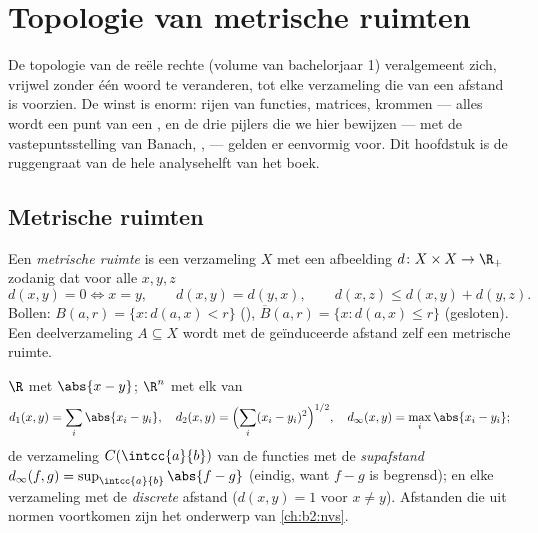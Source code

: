\chapter{Topologie van metrische ruimten}\label{ch:b2:metric}

De topologie van de reële rechte (volume van bachelorjaar 1)
veralgemeent zich, vrijwel zonder één woord te veranderen, tot elke
verzameling die van een afstand is voorzien. De winst is enorm:
rijen van functies, matrices, krommen --- alles wordt een punt van
een , en de drie pijlers die we hier bewijzen ---
 met de vastepuntsstelling van Banach, ,
 --- gelden er eenvormig voor. Dit hoofdstuk is de
ruggengraat van de hele analysehelft van het boek.

\section{Metrische ruimten}

\begin{definition}\label{def:b2:metric:def}
Een \emph{metrische ruimte} is een
verzameling $X$ met een afbeelding $d \colon X \times X \to \R_+$
zodanig dat voor alle $x, y, z$
\[
d(x,y) = 0 \iff x = y,
\qquad
d(x,y) = d(y,x),
\qquad
d(x,z) \leq d(x,y) + d(y,z).
\]
Bollen: $B(a, r) = \{x : d(a,x) < r\}$ (), $\overline B(a,r) =
\{x : d(a,x) \leq r\}$ (gesloten). Een deelverzameling $A \subseteq
X$ wordt met de geïnduceerde afstand zelf een metrische ruimte.
\end{definition}

\begin{example}\label{ex:b2:metric:examples}
$\R$ met $\abs{x - y}$; $\R^n$ met elk van
\[
d_1(x,y) = \sum_i \abs{x_i - y_i},
\quad
d_2(x,y) = \Bigl(\sum_i (x_i - y_i)^2\Bigr)^{1/2},
\quad
d_\infty(x,y) = \max_i \abs{x_i - y_i};
\]
de verzameling $C(\intcc{a}{b})$ van de  functies met de
\emph{supafstand} $d_\infty(f, g) = \sup_{\intcc{a}{b}} \abs{f -
g}$ (eindig, want $f - g$ is begrensd); en elke verzameling met de
\emph{discrete} afstand ($d(x,y) = 1$ voor $x \neq y$). Afstanden
die uit normen voortkomen zijn het onderwerp van
\cref{ch:b2:nvs}.
\end{example}

